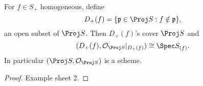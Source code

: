 \documentclass[a4paper]{article}
\newcommand{\sh}[1]{\mathcal{#1}} %
\begin{document}
\begin{proposition}
  For \(f \in S_+\) homogeneous, define
  \[
    D_+(f) = \{\mathfrak p \in \Proj S: f \notin \mathfrak p\},
  \]
  an open subset of \(\Proj S\). Then \(D_+(f)\)'s cover \(\Proj S\) and
  \[
    (D_+(f), \sh O_{\Proj S}|_{D_+(f)}) \cong \Spec S_{(f)}.
  \]
  In particular \((\Proj S, \sh O_{\Proj S})\) is a scheme.
\end{proposition}

\begin{proof}
  Example sheet 2.
\end{proof}




\printindex
\end{document}
